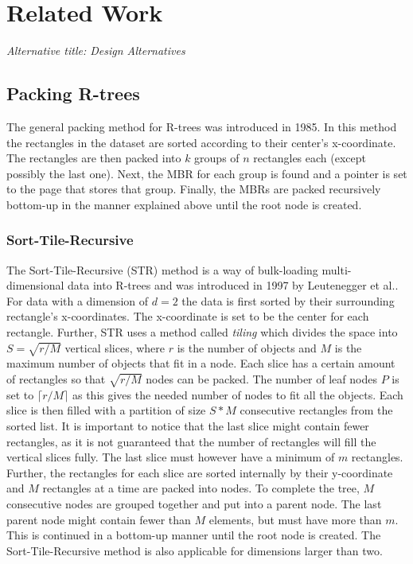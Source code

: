 \chapter{Related Work}
\emph{Alternative title: Design Alternatives}


\section{Packing R-trees}
The general packing method for R-trees was introduced in 1985\cite{DirectSpatialSearch}. In this method the rectangles in the dataset are sorted according to their center's x-coordinate. The rectangles are then packed into $k$ groups of $n$ rectangles each (except possibly the last one). Next, the MBR for each group is found and a pointer is set to the page that stores that group. Finally, the MBRs are packed recursively bottom-up in the manner explained above until the root node is created. 

\subsection{Sort-Tile-Recursive}
The Sort-Tile-Recursive (STR) method is a way of bulk-loading multi-dimensional data into R-trees and was introduced in 1997 by Leutenegger et al.\cite{STR}. For data with a dimension of $d=2$ the data is first sorted by their surrounding rectangle's x-coordinates. The x-coordinate is set to be the center for each rectangle. Further, STR uses a method called \emph{tiling} which divides the space into $S = \sqrt{r/M}$ vertical slices, where $r$ is the number of objects and $M$ is the maximum number of objects that fit in a node. Each slice has a certain amount of rectangles so that $\sqrt{r/M}$ nodes can be packed. The number of leaf nodes $P$ is set to $\lceil{r/M}\rceil$ as this gives the needed number of nodes to fit all the objects. Each slice is then filled with a partition of size $S * M$ consecutive rectangles from the sorted list. It is important to notice that the last slice might contain fewer rectangles, as it is not guaranteed that the number of rectangles will fill the vertical slices fully. The last slice must however have a minimum of $m$ rectangles. Further, the rectangles for each slice are sorted internally by their y-coordinate and $M$ rectangles at a time are packed into nodes. To complete the tree, $M$ consecutive nodes are grouped together and put into a parent node. The last parent node might contain fewer than $M$ elements, but must have more than $m$. This is continued in a bottom-up manner until the root node is created. The Sort-Tile-Recursive method is also applicable for dimensions larger than two. \newline

